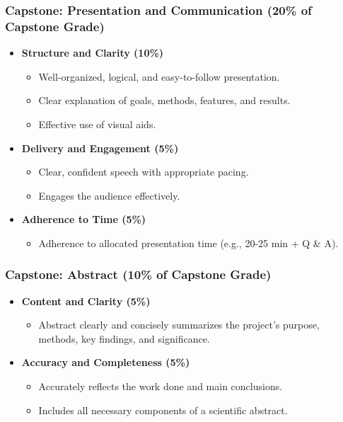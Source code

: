 \documentclass{beamer}
\begin{document}
\begin{frame}[t]
\frametitle{Capstone: Presentation and Communication (20\% of Capstone Grade)}
\begin{itemize}
    \item \textbf{Structure and Clarity (10\%)}
    \begin{itemize}
        \item Well-organized, logical, and easy-to-follow presentation.
        \item Clear explanation of goals, methods, features, and results.
        \item Effective use of visual aids.
    \end{itemize}
    \vspace{0.5em}
    \item \textbf{Delivery and Engagement (5\%)}
    \begin{itemize}
        \item Clear, confident speech with appropriate pacing.
        \item Engages the audience effectively.
    \end{itemize}
    \vspace{0.5em}
    \item \textbf{Adherence to Time (5\%)}
    \begin{itemize}
        \item Adherence to allocated presentation time (e.g., 20-25 min + Q \& A).
    \end{itemize}
\end{itemize}
\end{frame}


\begin{frame}[t]
\frametitle{Capstone: Abstract (10\% of Capstone Grade)}
\begin{itemize}
    \item \textbf{Content and Clarity (5\%)}
    \begin{itemize}
        \item Abstract clearly and concisely summarizes the project's purpose, methods, key findings, and significance.
    \end{itemize}
    \vspace{0.5em}
    \item \textbf{Accuracy and Completeness (5\%)}
    \begin{itemize}
        \item Accurately reflects the work done and main conclusions.
        \item Includes all necessary components of a scientific abstract.
    \end{itemize}
\end{itemize}
\end{frame}
\end{document}
